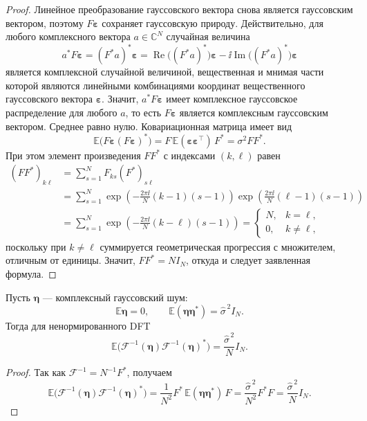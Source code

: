 \begin{proof}
Линейное преобразование гауссовского вектора снова является гауссовским
вектором, поэтому $F\boldsymbol{\varepsilon}$ сохраняет гауссовскую природу.
Действительно, для любого комплексного вектора $a\in\mathbb C^N$ случайная
величина
\[
a^{*}F\boldsymbol{\varepsilon}
=
(F^{*}a)^{*}\boldsymbol{\varepsilon}
=
\operatorname{Re}\bigl((F^{*}a)^{*}\bigr)\boldsymbol{\varepsilon}
-
\ii\operatorname{Im}\bigl((F^{*}a)^{*}\bigr)\boldsymbol{\varepsilon}
\]
является комплексной случайной величиной, вещественная и мнимая части которой
являются линейными комбинациями координат вещественного гауссовского вектора
$\boldsymbol{\varepsilon}$. Значит, $a^{*}F\boldsymbol{\varepsilon}$ имеет
комплексное гауссовское распределение для любого $a$, то есть
$F\boldsymbol{\varepsilon}$ является комплексным гауссовским вектором.
Среднее равно нулю. Ковариационная матрица имеет вид
\[
\mathbb{E}\bigl(
F\boldsymbol{\varepsilon}
(F\boldsymbol{\varepsilon})^{*}
\bigr)
=
F\,\mathbb{E}(\boldsymbol{\varepsilon}\boldsymbol{\varepsilon}^{\top})\,F^{*}
=
\sigma^2 FF^{*}.
\]
При этом элемент произведения $FF^*$ с индексами $(k,\ell)$ равен
\[
\begin{aligned}
(FF^{*})_{k\ell}
&=
\sum_{s=1}^{N}
F_{ks}(F^{*})_{s\ell}
\\
&=
\sum_{s=1}^{N}
\exp\!\left(
-\frac{2\pi\ii}{N}(k-1)(s-1)
\right)
\exp\!\left(
\frac{2\pi\ii}{N}(\ell-1)(s-1)
\right)
\\
&=
\sum_{s=1}^{N}
\exp\!\left(
-\frac{2\pi\ii}{N}(k-\ell)(s-1)
\right)
=
\begin{cases}
N, & k=\ell,\\
0, & k\ne\ell,
\end{cases}
\end{aligned}
\]
поскольку при $k\ne\ell$ суммируется геометрическая прогрессия с множителем,
отличным от единицы. Значит, $FF^{*}=NI_N$, откуда и следует заявленная формула.
\end{proof}

\begin{corollary}
Пусть $\boldsymbol{\eta}$ --- комплексный гауссовский шум:
\[
\mathbb{E}\boldsymbol{\eta}=0,
\qquad
\mathbb{E}(\boldsymbol{\eta}\boldsymbol{\eta}^{*})
=
\widehat{\sigma}^{\,2}I_N.
\]
Тогда для ненормированного DFT
\[
\mathbb{E}\bigl(
\mathcal{F}^{-1}(\boldsymbol{\eta})
\mathcal{F}^{-1}(\boldsymbol{\eta})^{*}
\bigr)
=
\frac{\widehat{\sigma}^{\,2}}{N}I_N.
\]
\end{corollary}

\begin{proof}
Так как $\mathcal{F}^{-1}=N^{-1}F^{*}$, получаем
\[
\mathbb{E}\bigl(
\mathcal{F}^{-1}(\boldsymbol{\eta})
\mathcal{F}^{-1}(\boldsymbol{\eta})^{*}
\bigr)
=
\frac{1}{N^2}
F^{*}\,
\mathbb{E}(\boldsymbol{\eta}\boldsymbol{\eta}^{*})\,
F
=
\frac{\widehat{\sigma}^{\,2}}{N^2}F^{*}F
=
\frac{\widehat{\sigma}^{\,2}}{N}I_N.
\]
\end{proof}

